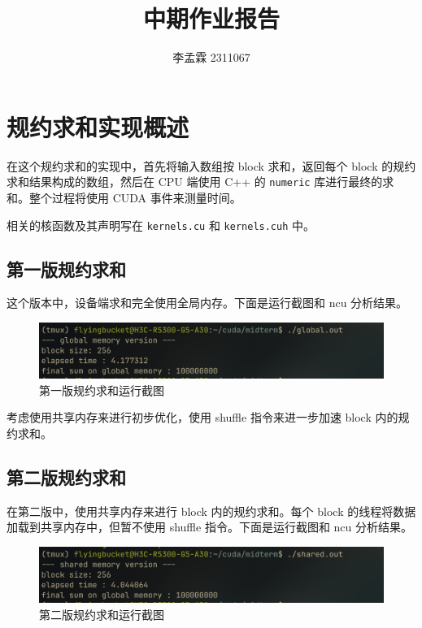 \documentclass{article}
\title{中期作业报告}
\author{李孟霖 2311067}
\date{}
\begin{document}
\maketitle

\section{规约求和实现概述}

在这个规约求和的实现中，首先将输入数组按 block 求和，返回每个 block 的规约求和结果构成的数组，然后在 CPU 端使用 C++ 的 \texttt{numeric} 库进行最终的求和。整个过程将使用 CUDA 事件来测量时间。

相关的核函数及其声明写在 \texttt{kernels.cu} 和 \texttt{kernels.cuh} 中。

\subsection{第一版规约求和}

这个版本中，设备端求和完全使用全局内存。下面是运行截图和 ncu 分析结果。

\begin{figure}[h]
    \centering
    \includegraphics[width=0.7\linewidth]{./images/reduce_v1.png}
    \caption{第一版规约求和运行截图}
\end{figure}


考虑使用共享内存来进行初步优化，使用 shuffle 指令来进一步加速 block 内的规约求和。

\subsection{第二版规约求和}

在第二版中，使用共享内存来进行 block 内的规约求和。每个 block 的线程将数据加载到共享内存中，但暂不使用 shuffle 指令。下面是运行截图和 ncu 分析结果。

\begin{figure}[h]
    \centering
    \includegraphics[width=0.7\linewidth]{./images/reduce_v2.png}
    \caption{第二版规约求和运行截图}
\end{figure}
\end{document}
